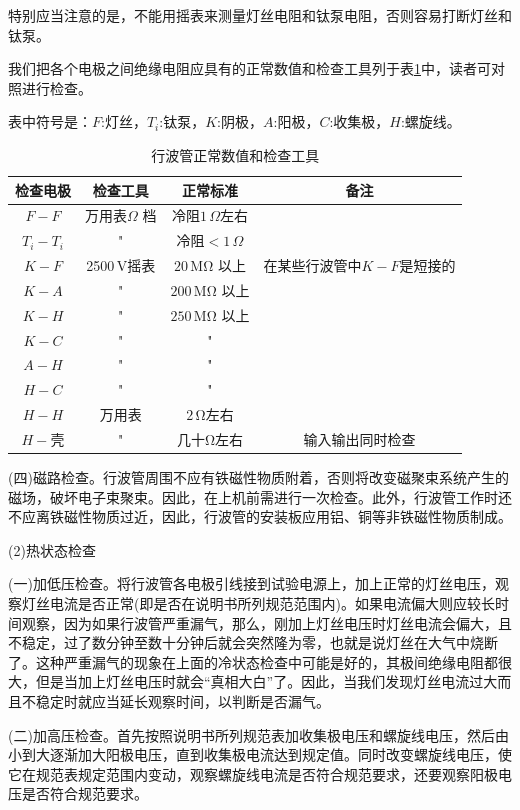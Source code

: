 特别应当注意的是，不能用摇表来测量灯丝电阻和钛泵电阻，否则容易打断灯丝和钛泵。

我们把各个电极之间绝缘电阻应具有的正常数值和检查工具列于表\ref{tab:12-1}中，读者可对照进行检查。

表中符号是：$ F $:灯丝，$ T_i $:钛泵，$ K $:阴极，$ A $:阳极，$ C $:收集极，$ H $:螺旋线。

\begin{table} 
	\caption{行波管正常数值和检查工具}
	\label{tab:12-1}
	\begin{tabular}{cccc}
		\toprule
		检查电极&检查工具&正常标准&备注  \\ 
		\midrule
		$ F-F $	& 万用表$ \Omega$ 档 &冷阻$ 1\,\Omega $左右 &  \\ 
		$ T_i -T_i $	& "& 冷阻$ <1\,\Omega $ &  \\ 
		$ K-F $	& 2500\,V摇表 & $ 20\,\si{\Mohm} $ 以上& 在某些行波管中$ K-F $是短接的 \\ 
		$ K-A $	&"  & $ 200\,\si{\Mohm} $ 以上&  \\ 
		$ K-H $	& " &$ 250\,\si{\Mohm} $  以上&  \\ 
		$ K-C $&" & " &   \\ 
		$ A-H $	&"&" &  \\ 
			$ H-C $&"& " &  \\
		$ H-H $&万用表&$ 2\,\si{\ohm} $左右 & \\
 $ H-\textrm{壳} $&" &几十$ \si{\ohm} $左右 & 输入输出同时检查\\
		\bottomrule 
	\end{tabular} 
\end{table}

(四)磁路检查。行波管周围不应有铁磁性物质附着，否则将改变磁聚束系统产生的磁场，破坏电子束聚束。因此，在上机前需进行一次检查。此外，行波管工作时还不应离铁磁性物质过近，因此，行波管的安装板应用铝、铜等非铁磁性物质制成。


(2)热状态检查

(一)加低压检查。将行波管各电极引线接到试验电源上，加上正常的灯丝电压，观察灯丝电流是否正常(即是否在说明书所列规范范围内)。如果电流偏大则应较长时间观察，因为如果行波管严重漏气，那么，刚加上灯丝电压时灯丝电流会偏大，且不稳定，过了数分钟至数十分钟后就会突然隆为零，也就是说灯丝在大气中烧断了。这种严重漏气的现象在上面的冷状态检查中可能是好的，其极间绝缘电阻都很大，但是当加上灯丝电压时就会“真相大白”了。因此，当我们发现灯丝电流过大而且不稳定时就应当延长观察时间，以判断是否漏气。

(二)加高压检查。首先按照说明书所列规范表加收集极电压和螺旋线电压，然后由小到大逐渐加大阳极电压，直到收集极电流达到规定值。同时改变螺旋线电压，使它在规范表规定范围内变动，观察螺旋线电流是否符合规范要求，还要观察阳极电压是否符合规范要求。

